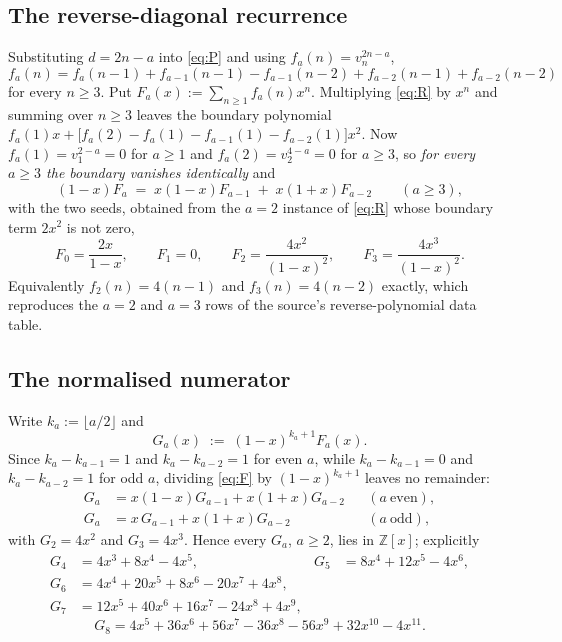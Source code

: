 \documentclass[11pt]{amsart}
\theoremstyle{remark}
\begin{document}
\subsection*{The reverse-diagonal recurrence}
Substituting $d=2n-a$ into \eqref{eq:P} and using $f_a(n)=v_n^{2n-a}$,
\begin{equation}\label{eq:R}
 f_a(n)=f_a(n-1)+f_{a-1}(n-1)-f_{a-1}(n-2)+f_{a-2}(n-1)+f_{a-2}(n-2)
\end{equation}
for every $n\ge3$.
Put $F_a(x):=\sum_{n\ge1}f_a(n)x^n$. Multiplying \eqref{eq:R} by $x^n$ and
summing over $n\ge3$ leaves the boundary polynomial
$f_a(1)x+\bigl[f_a(2)-f_a(1)-f_{a-1}(1)-f_{a-2}(1)\bigr]x^2$. Now
$f_a(1)=v_1^{2-a}=0$ for $a\ge1$ and $f_a(2)=v_2^{4-a}=0$ for $a\ge3$, so
\emph{for every $a\ge3$ the boundary vanishes identically} and
\begin{equation}\label{eq:F}
 (1-x)F_a \;=\; x(1-x)F_{a-1}\;+\;x(1+x)F_{a-2}\qquad(a\ge3),
\end{equation}
with the two seeds, obtained from the $a=2$ instance of \eqref{eq:R} whose
boundary term $2x^2$ is not zero,
\[
 F_0=\frac{2x}{1-x},\qquad F_1=0,\qquad
 F_2=\frac{4x^2}{(1-x)^2},\qquad F_3=\frac{4x^3}{(1-x)^2}.
\]
Equivalently $f_2(n)=4(n-1)$ and $f_3(n)=4(n-2)$ exactly, which reproduces the
$a=2$ and $a=3$ rows of the source's reverse-polynomial data table.

\subsection*{The normalised numerator}
Write $k_a:=\lfloor a/2\rfloor$ and
\[
 G_a(x)\;:=\;(1-x)^{k_a+1}F_a(x).
\]
Since $k_a-k_{a-1}=1$ and $k_a-k_{a-2}=1$ for even $a$, while $k_a-k_{a-1}=0$
and $k_a-k_{a-2}=1$ for odd $a$, dividing \eqref{eq:F} by
$(1-x)^{k_a+1}$ leaves no remainder:
\begin{equation}\label{eq:G}
\begin{aligned}
 G_a&=x(1-x)G_{a-1}+x(1+x)G_{a-2} && (a\ \text{even}),\\
 G_a&=x\,G_{a-1}+x(1+x)G_{a-2} && (a\ \text{odd}),
\end{aligned}
\end{equation}
with $G_2=4x^2$ and $G_3=4x^3$. Hence every $G_a$, $a\ge2$, lies in
$\mathbb Z[x]$; explicitly
\begin{align*}
 G_4&=4x^3+8x^4-4x^5, & G_5&=8x^4+12x^5-4x^6,\\
 G_6&=4x^4+20x^5+8x^6-20x^7+4x^8, &&\\
 G_7&=12x^5+40x^6+16x^7-24x^8+4x^9, &&
\end{align*}
\[
 G_8=4x^5+36x^6+56x^7-36x^8-56x^9+32x^{10}-4x^{11}.
\]
\end{document}

